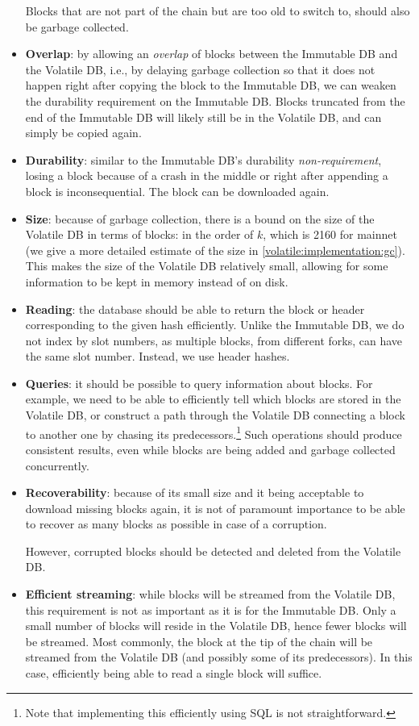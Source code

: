 \begin{itemize}
  Blocks that are not part of the chain but are too old to switch to, should
  also be garbage collected.
\item \textbf{Overlap}: by allowing an \emph{overlap} of blocks between the
  Immutable DB and the Volatile DB, i.e., by delaying garbage collection so that
  it does not happen right after copying the block to the Immutable DB, we can
  weaken the durability requirement on the Immutable DB. Blocks truncated from
  the end of the Immutable DB will likely still be in the Volatile DB, and can
  simply be copied again.
\item \textbf{Durability}: similar to the Immutable DB's durability
  \emph{non-requirement}, losing a block because of a crash in the middle or
  right after appending a block is inconsequential. The block can be downloaded
  again.
\item \textbf{Size}: because of garbage collection, there is a bound on the size
  of the Volatile DB in terms of blocks: in the order of $k$, which is 2160 for
  mainnet (we give a more detailed estimate of the size in
  \cref{volatile:implementation:gc}). This makes the size of the Volatile DB
  relatively small, allowing for some information to be kept in memory instead
  of on disk.
\item \textbf{Reading}: the database should be able to return the block or
  header corresponding to the given hash efficiently. Unlike the Immutable DB,
  we do not index by slot numbers, as multiple blocks, from different forks, can
  have the same slot number. Instead, we use header hashes.
\item \textbf{Queries}: it should be possible to query information about blocks.
  For example, we need to be able to efficiently tell which blocks are stored in
  the Volatile DB, or construct a path through the Volatile DB connecting a
  block to another one by chasing its predecessors.\footnote{Note that
  implementing this efficiently using SQL is not straightforward.} Such
  operations should produce consistent results, even while blocks are being
  added and garbage collected concurrently.
\item \textbf{Recoverability}: because of its small size and it being acceptable
  to download missing blocks again, it is not of paramount importance to be able
  to recover as many blocks as possible in case of a corruption.

  However, corrupted blocks should be detected and deleted from the Volatile DB.
\item \textbf{Efficient streaming}: while blocks will be streamed from the
  Volatile DB, this requirement is not as important as it is for the Immutable
  DB. Only a small number of blocks will reside in the Volatile DB, hence fewer
  blocks will be streamed. Most commonly, the block at the tip of the chain will
  be streamed from the Volatile DB (and possibly some of its predecessors). In
  this case, efficiently being able to read a single block will suffice.
\end{itemize}

